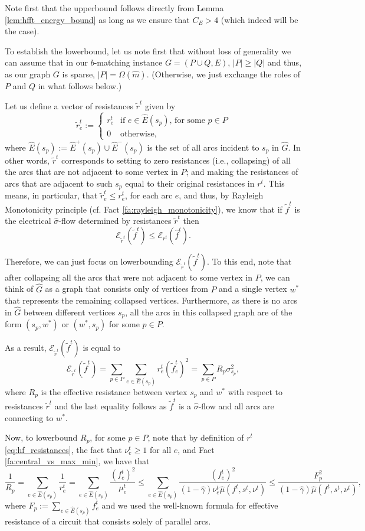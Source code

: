 \documentclass[11pt, letterpaper]{article}
\newcommand{\cenergy}{C_{E}}
\newcommand{\hG}{\widehat{G}}
\newcommand{\hE}{\widehat{E}}
\newcommand{\hm}{\widehat{m}}
\newcommand{\energy}[2]{\mathcal{E}_{#1}(#2)}
\newcommand{\tf}{\tilde{f}}
\newcommand{\tr}{\tilde{r}}
\newcommand{\hmu}{\hat{\mu}}
\newcommand{\hgamma}{\hat{\gamma}}
\newcommand{\vnu}{\boldsymbol{\mathit{\nu}}}
\newcommand{\hvsigma}{\boldsymbol{\mathit{\hat{\sigma}}}}
\newcommand{\bb}{\boldsymbol{\mathit{b}}}
\newcommand{\ff}{\boldsymbol{\mathit{f}}}
\newcommand{\tff}{\boldsymbol{\mathit{\tilde{f}}}}
\newcommand{\hff}{\boldsymbol{\mathit{\hat{f}}}}
\newcommand{\rr}{\boldsymbol{\mathit{r}}}
\newcommand{\trr}{\boldsymbol{\mathit{\tilde{r}}}}
\renewcommand{\ss}{\boldsymbol{\mathit{s}}}
\begin{document}
Note first that the upperbound follows directly from Lemma \ref{lem:hfft_energy_bound} as long as we ensure that $\cenergy >4$ (which indeed will be the case). 

To establish the lowerbound, let us note first that without loss of generality we can assume that in our $\bb$-matching instance $G=(P\cup Q,E)$, $|P|\geq |Q|$ and thus, as our graph $G$ is sparse, $|P|=\Omega(\hm)$. (Otherwise, we just exchange the roles of $P$ and $Q$ in what follows below.)  

Let us define a vector of resistances $\trr^t$ given by
\[
\tr_{e}^t:=\begin{cases}
r_e^t & \mbox{if $e\in \hE(s_p)$, for some $p\in P$}\\
0 & \mbox{otherwise},
\end{cases}
\]
where $\hE(s_p):=\hE^+(s_p)\cup \hE^-(s_p)$ is the set of all arcs incident to $s_p$ in $\hG$. In other words, $\trr^t$ corresponds to setting to zero resistances (i.e., collapsing) of all the arcs that are not adjacent to some vertex in $P$; and making the resistances of arcs that are adjacent to such $s_p$ equal to their original resistances in $\rr^t$. This means, in particular, that $\tr_e^t\leq r_e^t$, for each arc $e$, and thus, by Rayleigh Monotonicity principle (cf. Fact \ref{fa:rayleigh_monotonicity}), we know that if $\tff^t$ is the electrical $\hvsigma$-flow determined by resistances $\trr^t$ then
\[
\energy{\trr^t}{\tff^t} \leq \energy{\rr^t}{\hff^t}.
\]

Therefore, we can just focus on lowerbounding $\energy{\trr^t}{\tff^t}$. To this end, note that after collapsing all the arcs that were not adjacent to some vertex in $P$, we can think of $\hG$ as a graph that consists only of vertices from $P$ and a single vertex $w^*$ that represents the remaining collapsed vertices. Furthermore, as there is no arcs in $\hG$ between different vertices $s_p$, all the arcs in this collapsed graph are of the form $(s_p,w^*)$ or $(w^*,s_p)$ for some $p\in P$.

As a result, $\energy{\trr^t}{\tff^t}$ is equal to
\[
\energy{\trr^t}{\tff^t}=\sum_{p\in P} \sum_{e\in \hE(s_p)} r_e^t (\tf_e^t)^2 = \sum_{p\in P} R_p \sigma_{s_p}^2,
\]
where $R_p$ is the effective resistance between vertex $s_p$ and $w^*$ with respect to resistances $\trr^t$ and the last equality follows as $\tff^t$ is a $\hvsigma$-flow and all arcs are connecting to $w^*$. 

Now, to lowerbound $R_p$, for some $p\in P$, note that by definition of $\rr^t$ \eqref{eq:hf_resistances}, the fact that $\nu_e^t\geq 1$ for all $e$, and Fact \ref{fa:central_vs_max_min}, we have that
\[
\frac{1}{R_p}=\sum_{e\in \hE(s_p)} \frac{1}{r_e^t} = \sum_{e\in \hE(s_p)} \frac{(f_e^t)^2}{\mu_e^t} \leq \sum_{e\in \hE(s_p)} \frac{(f_e^t)^2}{(1-\hgamma)\nu_e^t\hmu(\ff^t,\ss^t,\vnu^t)}\leq \frac{F_p^2}{(1-\hgamma)\hmu(\ff^t,\ss^t,\vnu^t)},
\]
where $F_p:=\sum_{e\in \hE(s_p)} f_e^t$ and we used the well-known formula for effective resistance of a circuit that consists solely of parallel arcs. 
\end{document}
